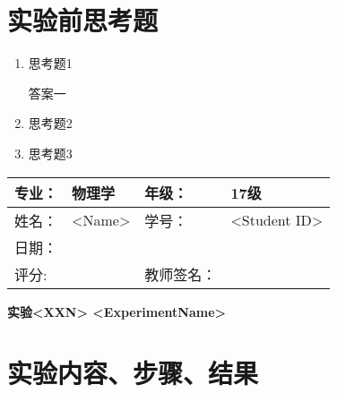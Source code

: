 \documentclass{ctexart}
\numberwithin{equation}{section}%
\newcommand{\ExpTitle}{实验<XXN> <ExperimentName>}
\newcommand{\stuName}{<Name>}
\newcommand{\stuID}{<Student ID>}
\theoremstyle{ansstyle}
\begin{document}
\section{实验前思考题}
\begin{enumerate}
    \item 思考题1
    \begin{ans}
        答案一
    \end{ans}
    \item 思考题2
    \item 思考题3
\end{enumerate}


\newpage

\begin{center}
    \begin{tabular}{|p{2cm}|p{4cm}|p{4cm}|p{4cm}|}
        \hline
        专业： & 物理学 & 年级： & 17级 \\
        \hline
        姓名： & \stuName & 学号： & \stuID \\
        \hline
        日期： &  & & \\
        \hline
        评分:  &   & 教师签名：& \\
        \hline
    \end{tabular}
\end{center}

\begin{center}
    \LARGE{\textbf{\ExpTitle}}
\end{center}


\section{实验内容、步骤、结果}
\end{document}
